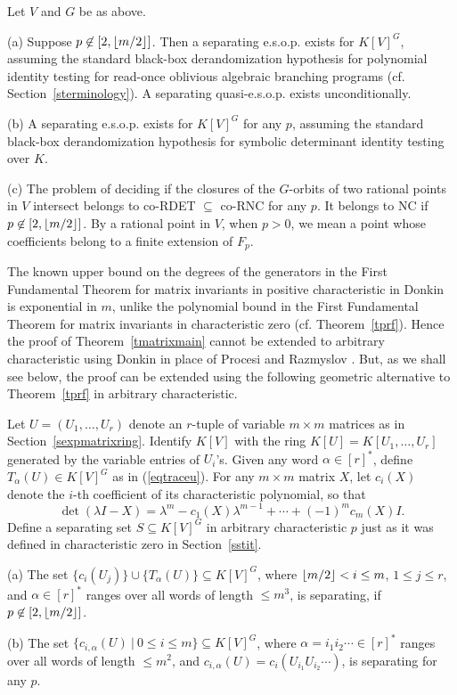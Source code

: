 \documentclass[11pt]{article}
\begin{document}
\begin{theorem} \label{tmatrixarbi}
Let $V$ and $G$ be as above.

\noindent (a) Suppose  $p \not \in [2,{\lfloor m/2 \rfloor}]$.
Then a separating e.s.o.p. exists  for $K[V]^G$,
 assuming the standard  black-box derandomization hypothesis for
polynomial identity testing for read-once oblivious algebraic branching programs
(cf. Section~\ref{sterminology}).
A separating quasi-e.s.o.p.  exists  unconditionally.

\noindent (b) A separating e.s.o.p. exists for  $K[V]^G$ for  any  $p$,
assuming the standard black-box derandomization hypothesis for symbolic determinant
identity testing over $K$.


\noindent (c) The problem of deciding if the closures of the $G$-orbits of two rational
points in $V$ intersect belongs to 
co-RDET $\subseteq$ co-RNC for any $p$. 
It belongs to  NC if $p \not \in [2,{\lfloor m/2 \rfloor}]$. By a rational point in $V$, when $p>0$,
we mean a point whose coefficients  belong to  a finite extension of $F_p$.
\end{theorem} 

The known upper bound  \cite{domokos} on the degrees of the generators
in the  First Fundamental Theorem for matrix invariants in positive characteristic in  Donkin \cite{donkin} is exponential in $m$, 
unlike the polynomial bound in  the First Fundamental Theorem for matrix invariants in characteristic zero 
(cf. Theorem~\ref{tprf}).
Hence  the proof of Theorem~\ref{tmatrixmain} cannot be extended to arbitrary characteristic
using  Donkin \cite{donkin}  in place of Procesi and Razmyslov \cite{procesimatrix,razmyslov}.
But, as we shall see below, the  proof can be extended  using the following geometric alternative to  Theorem~\ref{tprf}
in arbitrary characteristic.


Let $U=(U_1,\ldots,U_r)$ denote an $r$-tuple of variable $m\times m$ matrices as in Section~\ref{sexpmatrixring}. Identify
$K[V]$ with the ring $K[U]=K[U_1,\ldots,U_r]$ generated by the variable entries of $U_i$'s.
Given any word $\alpha \in [r]^*$, define  $T_\alpha(U) \in K[V]^G$ as in (\ref{eqtraceu}).
For any $m\times m$ matrix $X$, let $c_i(X)$ denote the $i$-th coefficient of its characteristic polynomial, so that
\[ \det(\lambda I -X)= \lambda^m -c_1(X) \lambda^{m-1} + \cdots + (-1)^m c_m(X) I. \] 
Define a  separating set $S \subseteq K[V]^G$ in arbitrary characteristic $p$
just as it was defined in characteristic zero in Section~\ref{sstit}.

\begin{theorem}   \label{tprocesigen}
\noindent (a) The set $\{c_i(U_j)\} \cup \{T_\alpha(U)\} \subseteq K[V]^G$, where 
${\lfloor m/2 \rfloor}< i \le m$, $1 \le j \le r$, and 
$\alpha \in [r]^*$ ranges over all words of length $\le m^3$,
is separating, if $p \not \in [2,{\lfloor m/2 \rfloor}]$. 

\noindent (b) The set 
$\{c_{i,\alpha}(U) \ | \ 0 \le i \le m\} \subseteq K[V]^G$, where
$\alpha=i_1 i_2 \cdots \in [r]^*$ ranges over all words of length $\le m^2$,
and $c_{i,\alpha}(U)=c_i(U_{i_1} U_{i_2} \cdots)$, 
is  separating for any $p$.
\end{theorem}
\end{document}
